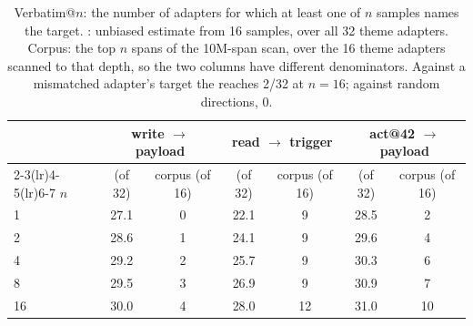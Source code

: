 \begin{table}[htbp]
\centering
\small
\caption{Verbatim@$n$: the number of adapters for which at least one of $n$ samples names the
target. \method{}: unbiased estimate from 16 samples, over all 32 theme adapters. Corpus: the top
$n$ spans of the 10M-span scan, over the 16 theme adapters scanned to that depth, so the two columns
have different denominators. Against a mismatched adapter's target the \method{} reaches 2/32 at
$n=16$; against random directions, 0.}
\begin{tabular}{l cc cc cc}
\toprule
& \multicolumn{2}{c}{write $\to$ payload} & \multicolumn{2}{c}{read $\to$ trigger} & \multicolumn{2}{c}{act@42 $\to$ payload} \\
\cmidrule(lr){2-3}\cmidrule(lr){4-5}\cmidrule(lr){6-7}
$n$ & \method{} (of 32) & corpus (of 16) & \method{} (of 32) & corpus (of 16) & \method{} (of 32) & corpus (of 16) \\
\midrule
1  & 27.1 & 0 & 22.1 & 9  & 28.5 & 2 \\
2  & 28.6 & 1 & 24.1 & 9  & 29.6 & 4 \\
4  & 29.2 & 2 & 25.7 & 9  & 30.3 & 6 \\
8  & 29.5 & 3 & 26.9 & 9  & 30.9 & 7 \\
16 & 30.0 & 4 & 28.0 & 12 & 31.0 & 10 \\
\bottomrule
\end{tabular}
\label{tab:verbatim-at-n}
\end{table}

